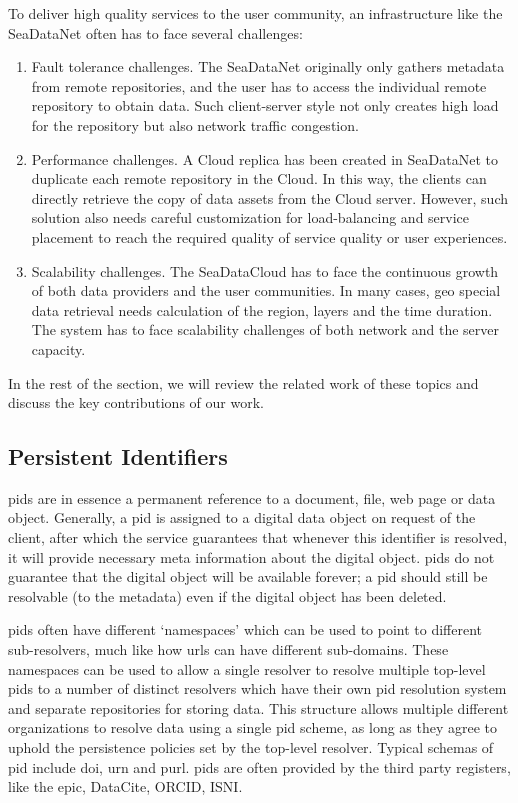 \documentclass[conference]{IEEEtran}
\begin{document}
To deliver high quality services to the user community, an infrastructure like the SeaDataNet often has to face several challenges:
\begin{enumerate}
    \item Fault tolerance challenges. The SeaDataNet originally only gathers metadata from remote repositories, and the user has to access the individual remote repository to obtain data. Such client-server style not only creates high load for the repository but also network traffic congestion.
    \item Performance challenges. A Cloud replica has been created in SeaDataNet to duplicate each remote repository in the Cloud. In this way, the clients can directly retrieve the copy of data assets from the Cloud server. However, such solution also needs careful customization for load-balancing and service placement to reach the required quality of service quality or user experiences.
    \item Scalability challenges. The SeaDataCloud has to face the continuous growth of both data providers and the user communities. In many cases, geo special data retrieval needs calculation of the region, layers and the time duration. The system has to face scalability challenges of both network and the server capacity. 
\end{enumerate}
In the rest of the section, we will review the related work of these topics and discuss the key contributions of our work. 

\subsection{Persistent Identifiers}
\label{sec:pids}

\glspl{pid} are in essence a permanent reference to a document, file, web page or data object. Generally, a \gls{pid} is assigned to a digital data object on request of the client, after which the service guarantees that whenever this identifier is resolved, it will provide necessary meta information about the digital object. \glspl{pid} do not guarantee that the digital object will be available forever; a \gls{pid} should still be resolvable (to the metadata) even if the digital object has been deleted. 

\glspl{pid} often have different `namespaces' which can be used to point to different sub-resolvers, much like how \glspl{url} can have different sub-domains. These namespaces can be used to allow a single resolver to resolve multiple top-level \glspl{pid} to a number of distinct resolvers which have their own \gls{pid} resolution system and separate repositories for storing data. This structure allows multiple different organizations to resolve data using a single \gls{pid} scheme, as long as they agree to uphold the persistence policies set by the top-level resolver. Typical schemas of \gls{pid} include \gls{doi}, \gls{urn} and \gls{purl}. \glspl{pid} are often provided by the third party registers, like the \gls{epic}, DataCite, ORCID, ISNI. 
\end{document}
